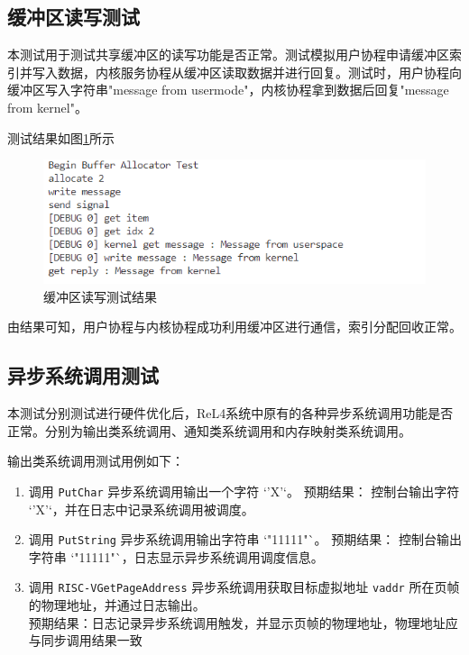 \subsection{缓冲区读写测试}

本测试用于测试共享缓冲区的读写功能是否正常。测试模拟用户协程申请缓冲区索引并写入数据，内核服务协程从缓冲区读取数据并进行回复。测试时，用户协程向缓冲区写入字符串"message from usermode"，内核协程拿到数据后回复"message from kernel"。

测试结果如图\ref*{buffertest}所示

\begin{figure}[htbp]
  \centering
  \includegraphics[width=\textwidth]{images/buffertest.png}
  \caption{缓冲区读写测试结果}\label{buffertest}
\end{figure}

由结果可知，用户协程与内核协程成功利用缓冲区进行通信，索引分配回收正常。

\subsection{异步系统调用测试}

本测试分别测试进行硬件优化后，ReL4系统中原有的各种异步系统调用功能是否正常。分别为输出类系统调用、通知类系统调用和内存映射类系统调用。

输出类系统调用测试用例如下：

\begin{enumerate}
  \item 调用 \texttt{PutChar} 异步系统调用输出一个字符 `'X'`。
        预期结果： 控制台输出字符 `'X'`，并在日志中记录系统调用被调度。

  \item 调用 \texttt{PutString} 异步系统调用输出字符串 `"11111"`。
        预期结果： 控制台输出字符串 `"11111"`，日志显示异步系统调用调度信息。
  \item 调用 \texttt{RISC-VGetPageAddress} 异步系统调用获取目标虚拟地址 \texttt{vaddr} 所在页帧的物理地址，并通过日志输出。\\
        预期结果：日志记录异步系统调用触发，并显示页帧的物理地址，物理地址应与同步调用结果一致
\end{enumerate}

